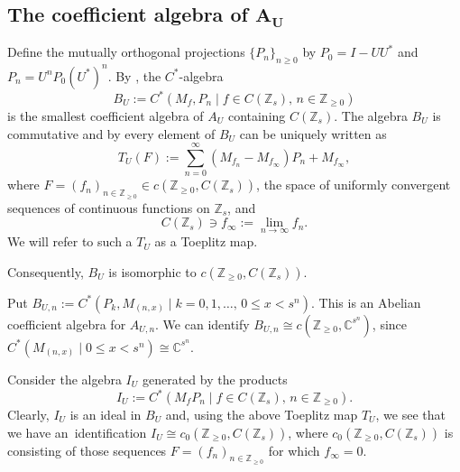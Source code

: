\documentclass[pdftex]{sigma}
\newcommand{\C}{{\mathbb C}}
\newcommand{\Z}{{\mathbb Z}}
\numberwithin{equation}{section}
\begin{document}
\subsection[The coefficient algebra of A\_U]{The coefficient algebra of $\boldsymbol{A_U}$}

Define the mutually orthogonal projections $\{P_n\}_{n\ge 0}$ by
$P_0=I-UU^*$ and $ P_n = U^nP_0(U^*)^{n}$.
By \cite[Proposition 4.2]{HKMP3}, the $C^*$-algebra
\begin{equation*}
B_U:=C^*(M_f,P_n\mid f\in C(\Z_s),\,n\in\Z_{\geq 0})
\end{equation*}
is the smallest coefficient algebra of $A_U$ containing $C(\Z_s)$. The algebra $B_U$ is commutative and by \cite[Proposition 4.3]{HKMP3} every element of $B_U$ can be uniquely written as
\begin{equation*}
T_U(F):= \sum_{n=0}^{\infty}(M_{f_n}-M_{f_\infty})P_n+M_{f_\infty},
\end{equation*}
where $F=(f_n)_{n\in \Z_{\ge0}}\in c(\Z_{\ge0}, C(\Z_s))$, the space of uniformly convergent sequences of continuous functions on $\Z_s$, and
\begin{equation}\label{finf}
C(\Z_s)\ni f_\infty:=\lim_{n\to\infty}f_n.
\end{equation}
We will refer to such a $T_U$ as a Toeplitz map.

Consequently,
$B_U$ is isomorphic to $c(\Z_{\ge0}, C(\Z_s))$.

Put $B_{U,n}:=C^*(P_k,M_{(n,x)}\mid k=0,1,\dots, \, 0\le x < s^n)$. This is an Abelian coefficient algebra for $A_{U,n}$. We can identify $B_{U,n}\cong c(\Z_{\ge 0},\C^{s^n})$, since $C^*(M_{(n,x)}\mid 0\le x < s^n)\cong \C^{s^n}$.


Consider the algebra $I_U$ generated by the products
\begin{equation*}
I_U:=C^*(M_fP_n\mid f\in C(\Z_s),\, n\in\Z_{\geq 0}).
\end{equation*}
Clearly, $I_U$ is an ideal in $B_U$ and, using the above Toeplitz map $T_U$, we see that we have an~identifi\-cation
$I_U\cong c_0(\Z_{\ge0}, C(\Z_s))$,
where $c_0(\Z_{\ge0}, C(\Z_s))$ is consisting of those sequences $F=(f_n)_{n\in \Z_{\ge0}}$ for which $f_\infty=0$.
\end{document}
